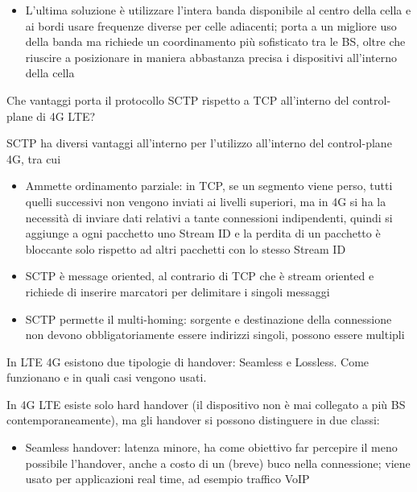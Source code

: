\begin{questions}
\begin{solution}
\begin{itemize}
            \item L'ultima soluzione è utilizzare l'intera banda disponibile al centro della cella e ai bordi usare frequenze diverse per celle adiacenti; porta a un migliore uso della banda ma richiede un coordinamento più sofisticato tra le BS, oltre che riuscire a posizionare in maniera abbastanza precisa i dispositivi all'interno della cella
        \end{itemize}
    \end{solution}
    
    \question Che vantaggi porta il protocollo SCTP rispetto a TCP all'interno del control-plane di 4G LTE?
    
    \begin{solution}
        SCTP ha diversi vantaggi all'interno per l'utilizzo all'interno del control-plane 4G, tra cui
        \begin{itemize}
            \item Ammette ordinamento parziale: in TCP, se un segmento viene perso, tutti quelli successivi non vengono inviati ai livelli superiori, ma in 4G si ha la necessità di inviare dati relativi a tante connessioni indipendenti, quindi si aggiunge a ogni pacchetto uno Stream ID e la perdita di un pacchetto è bloccante solo rispetto ad altri pacchetti con lo stesso Stream ID
            
            \item SCTP è message oriented, al contrario di TCP che è stream oriented e richiede di inserire marcatori per delimitare i singoli messaggi
            
            \item SCTP permette il multi-homing: sorgente e destinazione della connessione non devono obbligatoriamente essere indirizzi singoli, possono essere multipli
        \end{itemize}
    \end{solution}
    
    \question In LTE 4G esistono due tipologie di handover: Seamless e Lossless. Come funzionano e in quali casi vengono usati.
    
    \begin{solution}
        In 4G LTE esiste solo hard handover (il dispositivo non è mai collegato a più BS contemporaneamente), ma gli handover si possono distinguere in due classi: 
        \begin{itemize}
            \item Seamless handover: latenza minore, ha come obiettivo far percepire il meno possibile l'handover, anche a costo di un (breve) buco nella connessione; viene usato per applicazioni real time, ad esempio traffico VoIP
            

\end{itemize}
\end{solution}
\end{questions}
